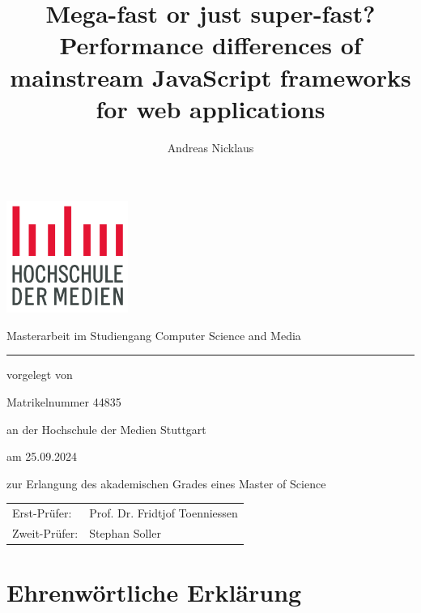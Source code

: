 \documentclass[a4paper, 12pt]{article}
\title{Mega-fast or just super-fast? Performance differences of mainstream JavaScript frameworks for web applications}
\author{Andreas Nicklaus}
\makeatletter
\let\Title\@title
\let\Author\@author
\makeatother
\begin{document}
\begin{titlepage}
	
  \begin{center}

    \includegraphics[width=150px, keepaspectratio]{img/hdm-logo.png}
    
    \vspace{30px}
    {\large Masterarbeit im Studiengang Computer Science and Media}
    
    \vspace{20px}
    {\LARGE \Title}
    
    \vspace{20px}
    \noindent\rule{\textwidth}{1pt}
    
    \vspace{15px}
    vorgelegt von
    
    \vspace{10px}
    \textbf{{\large \Author}}
    
    Matrikelnummer 44835
    
    \vspace{10px}
    an der Hochschule der Medien Stuttgart
    
    \vspace{10px}
    am 25.09.2024
    
    \vspace{10px}
    zur Erlangung des akademischen Grades eines Master of Science
  \end{center}	
  
  \vfill
  
  {\begin{tabular}[t]{ll}
    Erst-Prüfer: & Prof. Dr. Fridtjof Toenniessen \\
    Zweit-Prüfer: & Stephan Soller
  \end{tabular}}
\end{titlepage}


\section*{Ehrenwörtliche Erklärung}
	
\end{document}
